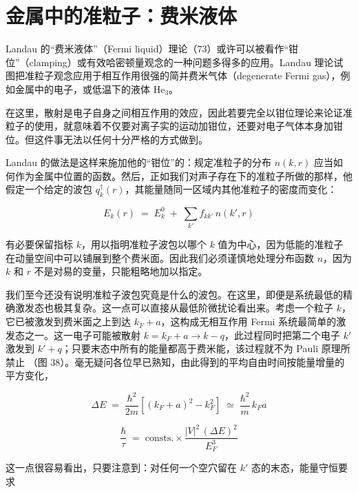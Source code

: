 
\section{金属中的准粒子：费米液体}

Landau 的“费米液体”（Fermi liquid）理论（73）或许可以被看作“钳位”（clamping）或有效哈密顿量观念的一种问题多得多的应用。Landau 理论试图把准粒子观念应用于相互作用很强的简并费米气体（degenerate Fermi gas），例如金属中的电子，或低温下的液体 He$_3$。

在这里，散射是电子自身之间相互作用的效应，因此若要完全以钳位理论来论证准粒子的使用，就意味着不仅要对离子实的运动加钳位，还要对电子气体本身加钳位。但这件事无法以任何十分严格的方式做到。

Landau 的做法是这样来施加他的“钳位”的：规定准粒子的分布 $n(k,r)$ 应当如何作为金属中位置的函数。然后，正如我们对声子存在下的准粒子所做的那样，他假定一个给定的波包 $q_k^{\dagger}(r)$，其能量随同一区域内其他准粒子的密度而变化：

\begin{equation*}
E_k(r) \;=\; E_k^{0} \;+\; \sum_{k'} f_{kk'}\, n(k', r)
\end{equation*}

有必要保留指标 $k$，用以指明准粒子波包以哪个 $k$ 值为中心，因为低能的准粒子在动量空间中可以铺展到整个费米面。因此我们必须谨慎地处理分布函数 $n$，因为 $k$ 和 $r$ 不是对易的变量，只能粗略地加以指定。

我们至今还没有说明准粒子波包究竟是什么的波包。在这里，即便是系统最低的精确激发态也极其复杂。这一点可以直接从最低阶微扰论看出来。考虑一个粒子 $k$，它已被激发到费米面之上到达 $k_F+a$，这构成无相互作用 Fermi 系统最简单的激发态之一。这一电子可能被散射 $k = k_F + a \to k - q$，此过程同时把第二个电子 $k'$ 激发到 $k'+q$；只要末态中所有的能量都高于费米能，该过程就不为 Pauli 原理所禁止
（图 38）。毫无疑问各位早已熟知，由此得到的平均自由时间按能量增量的平方变化，

\begin{equation*}
\Delta E \;=\; \frac{\hbar^{2}}{2m}\left[(k_F+a)^{2} - k_F^{2}\right] \;\simeq\; \frac{\hbar^{2}}{m}\, k_F a
\end{equation*}

\begin{equation*}
\frac{\hbar}{\tau} \;=\; \text{consts.} \times \frac{|V|^{2}\,(\Delta E)^{2}}{E_F^{3}}
\end{equation*}

这一点很容易看出，只要注意到：对任何一个空穴留在 $k'$ 态的末态，能量守恒要求

